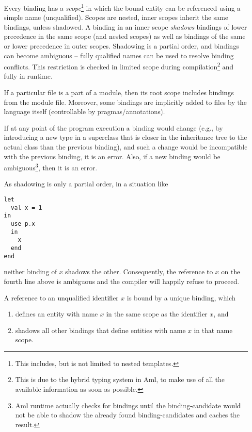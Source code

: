 Every binding has a \emph{scope}\footnote{This includes, but is not limited to nested templates.} in which the bound entity can be referenced using a simple name (unqualified). Scopes are nested, inner scopes inherit the same bindings, unless shadowed. A binding in an inner scope \emph{shadows} bindings of lower precedence in the same scope (and nested scopes) as well as bindings of the same or lower precedence in outer scopes. Shadowing is a partial order, and bindings can become ambiguous -- fully qualified names can be used to resolve binding conflicts. This restriction is checked in limited scope during compilation\footnote{This is due to the hybrid typing system in Aml, to make use of all the available information as soon as possible.} and fully in runtime. 

If a particular file is a part of a module, then its root scope includes bindings from the module file. Moreover, some bindings are implicitly added to files by the language itself (controllable by pragmas/annotations). 

If at any point of the program execution a binding would change (e.g., by introducing a new type in a superclass that is closer in the inheritance tree to the actual class than the previous binding), and such a change would be incompatible with the previous binding, it is an error. Also, if a new binding would be ambiguous\footnote{Aml runtime actually checks for bindings until the binding-candidate would not be able to shadow the already found binding-candidates and caches the result.}, then it is an error. 

As shadowing is only a partial order, in a situation like

\begin{lstlisting}
let 
  val x = 1 
in
  use p.x 
  in
    x
  end
end
\end{lstlisting}

neither binding of $x$ shadows the other. Consequently, the reference to $x$ on the fourth line above is ambiguous and the compiler will happily refuse to proceed. 

A reference to an unqualified identifier $x$ is bound by a unique binding, which

\begin{enumerate}
\item defines an entity with name $x$ in the same scope as the identifier $x$, and
\item shadows all other bindings that define entities with name $x$ in that name scope.
\end{enumerate}

